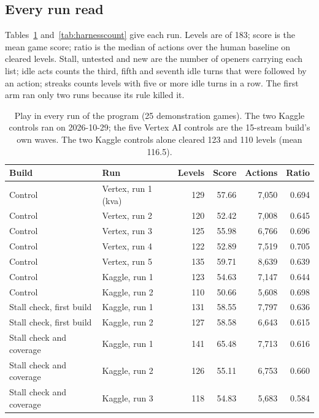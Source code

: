 \subsection{Every run read}

Tables~\ref{tab:harnessplay} and~\ref{tab:harnesscount} give each run. Levels are of 183; score is the mean game score; ratio is the median of actions over the human baseline on cleared levels. Stall, untested and new are the number of openers carrying each list; idle acts counts the third, fifth and seventh idle turns that were followed by an action; streaks counts levels with five or more idle turns in a row. The first arm ran only two runs because its rule killed it.

\begin{table}[!htb]
\caption{Play in every run of the program (25 demonstration games). The two Kaggle controls ran on 2026-10-29; the five Vertex AI controls are the 15-stream build's own waves. The two Kaggle controls alone cleared 123 and 110 levels (mean 116.5).}\label{tab:harnessplay} %
\centering\footnotesize
\setlength{\tabcolsep}{4pt}
\begin{tabular}{@{}llrrrr@{}}
\toprule
Build & Run & Levels & Score & Actions & Ratio \\
\midrule
Control & Vertex, run 1 (kva) & 129 & 57.66 & 7,050 & 0.694 \\
Control & Vertex, run 2 & 120 & 52.42 & 7,008 & 0.645 \\
Control & Vertex, run 3 & 125 & 55.98 & 6,766 & 0.696 \\
Control & Vertex, run 4 & 122 & 52.89 & 7,519 & 0.705 \\
Control & Vertex, run 5 & 135 & 59.71 & 8,639 & 0.639 \\
Control & Kaggle, run 1 & 123 & 54.63 & 7,147 & 0.644 \\
Control & Kaggle, run 2 & 110 & 50.66 & 5,608 & 0.698 \\
Stall check, first build & Kaggle, run 1 & 131 & 58.55 & 7,797 & 0.636 \\
Stall check, first build & Kaggle, run 2 & 127 & 58.58 & 6,643 & 0.615 \\
Stall check and coverage & Kaggle, run 1 & 141 & 65.48 & 7,713 & 0.616 \\
Stall check and coverage & Kaggle, run 2 & 126 & 55.11 & 6,753 & 0.660 \\
Stall check and coverage & Kaggle, run 3 & 118 & 54.83 & 5,683 & 0.584 \\

\end{tabular}
\end{table}
